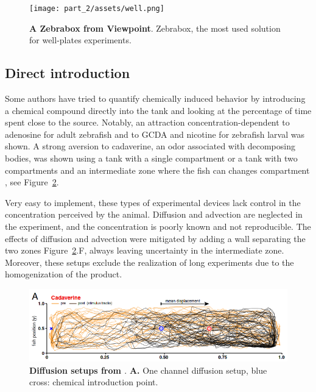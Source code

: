     \begin{figure}[h]
      \centering
      \texttt{[image: part\_2/assets/well.png]}
      \caption{\textbf{A Zebrabox from Viewpoint}.  Zebrabox, the most used solution for well-plates experiments.}
      \label{zebrabox}
    \end{figure}

    \subsection{Direct introduction}
    Some authors have tried to quantify chemically induced behavior by introducing a chemical compound directly into the tank and looking at the percentage of time spent close to the source. Notably, an attraction concentration-dependent to adenosine for adult zebrafish\cite{wakisaka2017adenosine} and to GCDA and nicotine for zebrafish larval \cite{krishnan2014right} was shown. A strong aversion to cadaverine, an odor associated with decomposing bodies, was shown using a tank with a single compartment or a tank with two compartments and an intermediate zone where the fish can changes compartment \cite{hussain2013high}, see Figure~\ref{diffusion_setup}.

    Very easy to implement, these types of experimental devices lack control in the concentration perceived by the animal. Diffusion and advection are neglected in the experiment, and the concentration is poorly known and not reproducible. The effects of diffusion and advection were mitigated \cite{hussain2013high} by adding a wall separating the two zones Figure~\ref{diffusion_setup}.F, always leaving uncertainty in the intermediate zone. Moreover, these setups exclude the realization of long experiments due to the homogenization of the product.

    \begin{figure}[h]
      \centering
      \includegraphics[width=1\textwidth]{part_2/assets/diffusion.png}
      \caption{\textbf{Diffusion setups from \cite{hussain2013high}}. \textbf{A.} One channel diffusion setup, blue cross: chemical introduction point.}
      \label{diffusion_setup}
    \end{figure}


